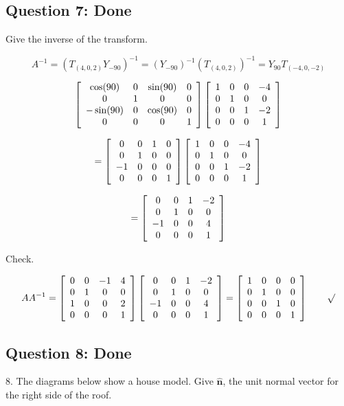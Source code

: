 \documentclass[11pt]{article}
\begin{document}
\begin{spacing}{1.2}
\subsection{Question 7:  Done}

Give the inverse of the transform.  

$$A^{-1}= \left(T_{(4,0,2)} Y_{-90}\right)^{-1} = 
\left( Y_{-90} \right)^{-1}\left( T_{(4,0,2)}\right)^{-1} = 
Y_{90} T_{(-4,0,-2)}
$$

$$
\left[
	\begin{array}{cccc}
		\cos (90) & 0 & \sin (90) & 0 \cr
		0 & 1 & 0 & 0 \cr
		-\sin(90) & 0 & \cos (90) & 0 \cr
		0 & 0 & 0 & 1 \cr
	\end{array}
\right]
\left[
\begin{array}{cccc}
	1 & 0 & 0 & -4 \cr
	0 & 1 & 0 & 0 \cr
	0 & 0 & 1 & -2 \cr
	0 & 0 & 0 & 1 \cr
\end{array}
\right]
$$

$$= 
\left[
	\begin{array}{cccc}
		0 & 0 & 1 & 0 \cr
		0 & 1 & 0 & 0 \cr
		-1 & 0 & 0 & 0 \cr
		0 & 0 & 0 & 1 \cr
	\end{array}
\right]
\left[
\begin{array}{cccc}
	1 & 0 & 0 & -4 \cr
	0 & 1 & 0 & 0 \cr
	0 & 0 & 1 & -2 \cr
	0 & 0 & 0 & 1 \cr
\end{array}
\right]
$$

$$= 
\left[
	\begin{array}{cccc}
		0 & 0 & 1 & -2 \cr
		0 & 1 & 0 & 0 \cr
		-1 & 0 & 0 & 4 \cr
		0 & 0 & 0 & 1 \cr
	\end{array}
\right]
$$

Check.  

$$ A A^{-1} = \left[
	\begin{array}{cccc}
		0 & 0 & -1 & 4 \cr
		0 & 1 & 0 & 0 \cr
		1 & 0 & 0 & 2 \cr
		0 & 0 & 0 & 1 \cr
	\end{array}
\right]
\left[
	\begin{array}{cccc}
		0 & 0 & 1 & -2 \cr
		0 & 1 & 0 & 0 \cr
		-1 & 0 & 0 & 4 \cr
		0 & 0 & 0 & 1 \cr
	\end{array}
\right]
=
\left[
	\begin{array}{cccc}
		1 & 0 & 0 & 0 \cr
		0 & 1 & 0 & 0 \cr
		0 & 0 & 1 & 0 \cr
		0 & 0 & 0 & 1 \cr
	\end{array}
\right]
\qquad \surd
$$



\subsection{Question 8:  Done}
8.  The diagrams below show a house model.  Give $\hat{\mathbf{n}}$, the unit normal vector for the right side of the roof.  


\end{spacing}
\end{document}
